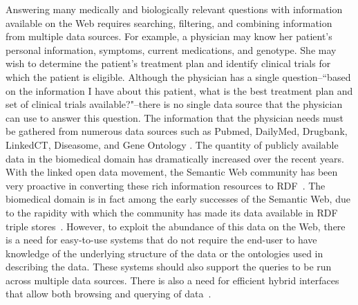 \documentclass{acm_proc_article-sp}
\begin{document}
Answering many medically and biologically relevant questions with information available on the Web requires searching, filtering, and combining information from multiple data sources.  For example, a physician may know her patient's personal information, symptoms, current medications, and genotype. She may wish to determine the patient's treatment plan and identify clinical trials for which the patient is eligible.  Although the physician has a single question--``based on the information I have about this patient, what is the best treatment plan and set of clinical trials available?"--there is no single data source that the physician can use to answer this question. The information that the physician needs must be gathered from numerous data sources such as Pubmed, DailyMed, Drugbank, LinkedCT, Diseasome,  and Gene Ontology \cite{Pubmed, DailyMed, Drugbank, LinkedCT, Diseasome, GO}. The quantity of publicly available data in the biomedical domain has dramatically increased over the recent years. With the linked open data movement, the Semantic Web community has been very proactive in converting these rich information resources to RDF~\cite{LinkingData}.  The biomedical domain is in fact among the early successes of the Semantic Web, due to the rapidity with which the community has made its data available in RDF triple stores~\cite{Yip}.  However, to exploit the abundance of this data on the Web, there is a need for easy-to-use systems that do not require the end-user to have knowledge of the underlying  structure of the data or the ontologies used in describing the data. These systems should also support the queries to be run across multiple data sources.  There is also a  need for efficient hybrid interfaces that allow both browsing and querying of data~\cite{Jentzsch}.  

\end{document}

